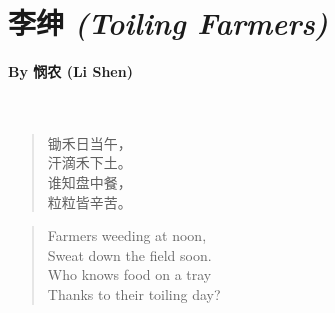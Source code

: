 \documentclass[12pt, openany, letterpaper]{memoir}
\begin{document}
\newpage
\pagestyle{empty}
\addtocounter{page}{-1}
\section*{{李绅} \emph{(Toiling Farmers)}}
\paragraph{By {悯农} (Li Shen)}~

{
	\begin{verse}
		锄禾日当午，\\
		汗滴禾下土。\\
		谁知盘中餐，\\
		粒粒皆辛苦。
	\end{verse}
}

\vspace{2em}
\begin{verse}
	Farmers weeding at noon,\\
	Sweat down the field soon.\\
	Who knows food on a tray\\
	Thanks to their toiling day?
\end{verse}
\end{document}
